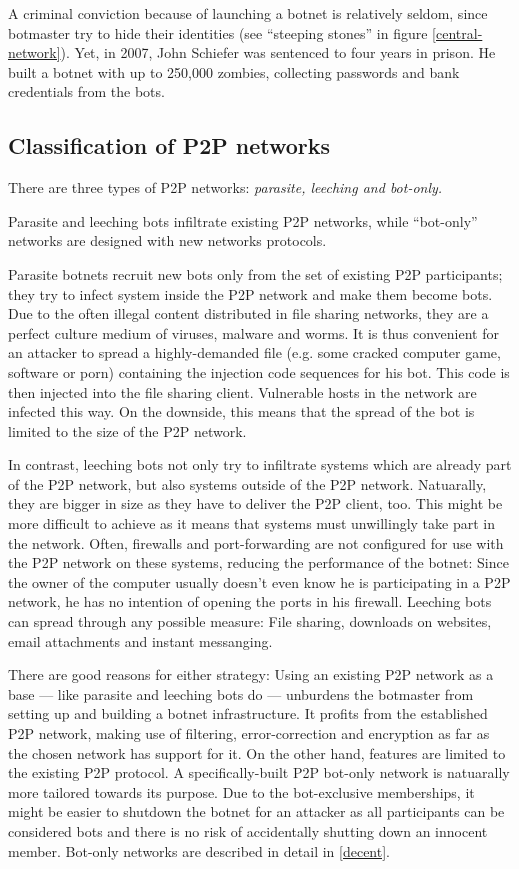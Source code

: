 \documentclass{llncs}
\begin{document}
 A criminal conviction because of launching a botnet is relatively
 seldom, since botmaster try to hide their identities (see ``steeping
 stones'' in figure \ref{central-network}). Yet, in 2007, John
 Schiefer was sentenced to four years in prison. He built a botnet
 with up to 250,000 zombies, collecting passwords and bank credentials
 from the bots.\cite{BotnetCrime}


\subsection{Classification of P2P networks}
\label{ClassificP2P}
There are three types of P2P networks: {\it parasite, leeching and
bot-only.}\cite{wang2009systematic} 

Parasite and leeching bots infiltrate existing P2P networks, while
``bot-only'' networks are designed with new networks protocols. 

Parasite botnets recruit new bots only from the set of existing P2P
participants; they try to infect system inside the P2P network and
make them become bots. Due to the often illegal content distributed in
file sharing networks, they are a perfect culture medium of viruses,
malware and worms. It is thus convenient for an attacker to spread a
highly-demanded file (e.g. some cracked computer game, software or
porn) containing the injection code sequences for his bot. This code is
then injected into the file sharing client. Vulnerable hosts in the
network are infected this way. On the downside, this means that the
spread of the bot is limited to the size of the P2P network.

In contrast, leeching bots not only try to infiltrate systems which
are already part of the P2P network, but also systems outside of the
P2P network. Natuarally, they are bigger in size as they have to
deliver the P2P client, too. This might be more difficult to achieve
as it means that systems must unwillingly take part in the
network. Often, firewalls and port-forwarding are not configured for
use with the P2P network on these systems, reducing the performance of
the botnet: Since the owner of the computer usually doesn't even know
he is participating in a P2P network, he has no intention of opening
the ports in his firewall. Leeching bots can spread through any
possible measure: File sharing, downloads on websites, email
attachments and instant messanging.

There are good reasons for either strategy: Using an existing P2P
network as a base --- like parasite and leeching bots do --- unburdens
the botmaster from setting up and building a botnet infrastructure. It
profits from the established P2P network, making use of filtering,
error-correction and encryption as far as the chosen network has
support for it. On the other hand, features are limited to the
existing P2P protocol. A specifically-built P2P bot-only network is
natuarally more tailored towards its purpose. Due to the bot-exclusive
memberships, it might be easier to shutdown the botnet for an attacker
as all participants can be considered bots and there is no risk of
accidentally shutting down an innocent member. Bot-only networks are
described in detail in \ref{decent}.
\end{document}
